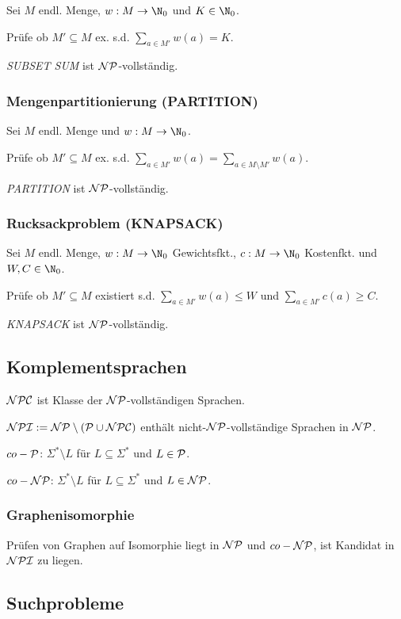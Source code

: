 Sei $M$ endl. Menge, $w : M \to \N_0$ und $K \in \N_0$.

Prüfe ob $M' \subseteq M$ ex. s.d. $\sum_{a \in M'} w(a) = K$.

\emph{SUBSET SUM} ist $\NP$-vollständig.

\subsubsection*{Mengenpartitionierung (PARTITION)}

Sei $M$ endl. Menge und $w : M \to \N_0$.

Prüfe ob $M' \subseteq M$ ex. s.d. $\textstyle\sum\limits_{a \in M'} w(a) = \textstyle\sum\limits_{a \in M \setminus M'} w(a)$.

\emph{PARTITION} ist $\NP$-vollständig.

\subsubsection*{Rucksackproblem (KNAPSACK)}

Sei $M$ endl. Menge, $w : M \to \N_0$ Gewichtsfkt., $c : M \to \N_0$ Kostenfkt. und $W,C \in \N_0$.

Prüfe ob $M' \subseteq M$ existiert s.d. $\sum_{a \in M'} w(a) \leq W$ und $\sum_{a \in M'} c(a) \geq C$.

\emph{KNAPSACK} ist $\NP$-vollständig.

\subsection*{Komplementsprachen}

$\NPC$ ist Klasse der $\NP$-vollständigen Sprachen.

$\NPI := \NP \setminus (\P \cup \NPC)$ enthält nicht-$\NP$-vollständige Sprachen in $\NP$.

$co-\P$: $\Sigma^* \setminus L$ für $L \subseteq \Sigma^*$ und $L \in \P$.

$co-\NP$: $\Sigma^* \setminus L$ für $L \subseteq \Sigma^*$ und $L \in \NP$.

\subsubsection*{Graphenisomorphie}

Prüfen von Graphen auf Isomorphie liegt in $\NP$ und $co-\NP$, ist Kandidat in $\NPI$ zu liegen.

\subsection*{Suchprobleme}

